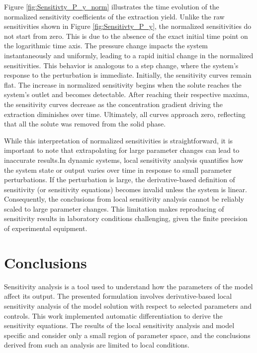 \documentclass[a4paper,fleqn]{cas-dc}
\begin{document}
	Figure \ref{fig:Sensitivty_P_y_norm} illustrates the time evolution of the normalized sensitivity coefficients of the extraction yield. Unlike the raw sensitivities shown in Figure \ref{fig:Sensitivty_P_y}, the normalized sensitivities do not start from zero. This is due to the absence of the exact initial time point on the logarithmic time axis. The pressure change impacts the system instantaneously and uniformly, leading to a rapid initial change in the normalized sensitivities. This behavior is analogous to a step change, where the system's response to the perturbation is immediate. Initially, the sensitivity curves remain flat. The increase in normalized sensitivity begins when the solute reaches the system's outlet and becomes detectable. After reaching their respective maxima, the sensitivity curves decrease as the concentration gradient driving the extraction diminishes over time. Ultimately, all curves approach zero, reflecting that all the solute was removed from the solid phase.
	
	While this interpretation of normalized sensitivities is straightforward, it is important to note that extrapolating for large parameter changes can lead to inaccurate results.In dynamic systems, local sensitivity analysis quantifies how the system state or output varies over time in response to small parameter perturbations. If the perturbation is large, the derivative-based definition of sensitivity (or sensitivity equations) becomes invalid unless the system is linear. Consequently, the conclusions from local sensitivity analysis cannot be reliably scaled to large parameter changes. This limitation makes reproducing of sensitivity results in laboratory conditions challenging, given the finite precision of experimental equipment.
	
	\section{Conclusions} \label{CH: Conclusion}
	
	Sensitivity analysis is a tool used to understand how the parameters of the model affect its output. The presented formulation involves derivative-based local sensitivity analysis of the model solution with respect to selected parameters and controls. This work implemented automatic differentiation to derive the sensitivity equations. The results of the local sensitivity analysis and model specific and consider only a small region of parameter space, and the conclusions derived from such an analysis are limited to local conditions.
	
\end{document}
